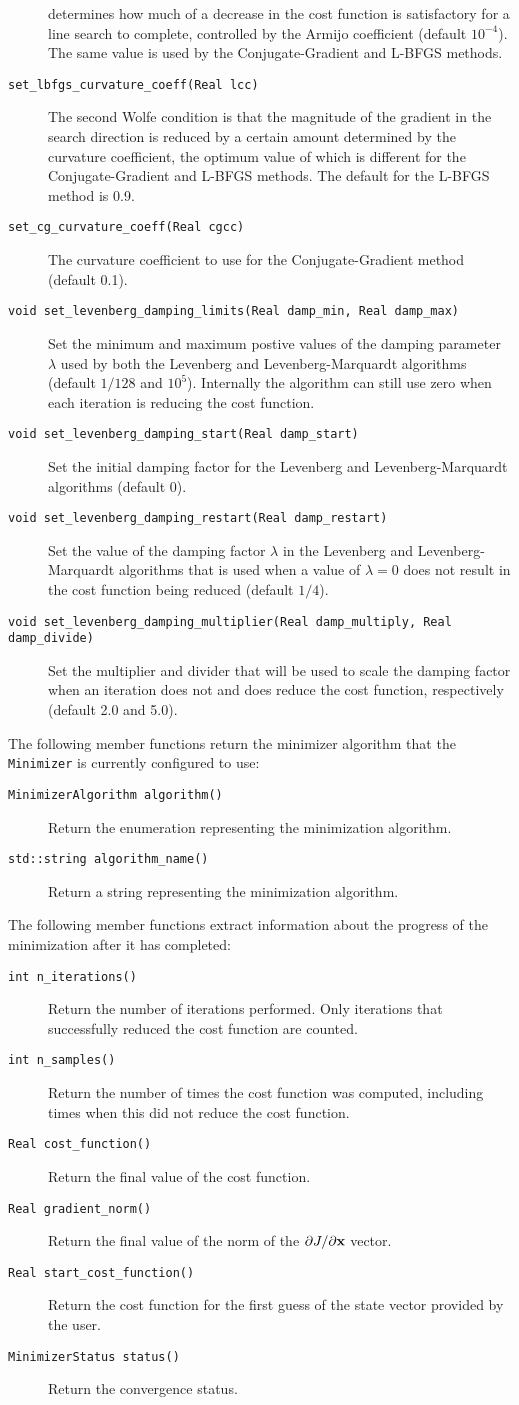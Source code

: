 \documentclass[a4,oneside]{book}
\def\codesize{\small}
\def\code#1{{\codesize\texttt{#1}}}
\def\citem#1{\item[{\codesize\texttt{#1}}]}
\begin{document}
\begin{description}
determines how much of a decrease in the cost function is satisfactory
for a line search to complete, controlled by the Armijo coefficient
(default $10^{-4}$). The same value is used by the Conjugate-Gradient
and L-BFGS methods.
%
\citem{set\_lbfgs\_curvature\_coeff(Real lcc)} The second Wolfe
condition is that the magnitude of the gradient in the search
direction is reduced by a certain amount determined by the curvature
coefficient, the optimum value of which is different for the
Conjugate-Gradient and L-BFGS methods. The default for the L-BFGS
method is 0.9.
%
\citem{set\_cg\_curvature\_coeff(Real cgcc)} The curvature coefficient
to use for the Conjugate-Gradient method (default 0.1).
%
\citem{void set\_levenberg\_damping\_limits(Real damp\_min, Real
  damp\_max)} Set the minimum and maximum postive values of the
damping parameter $\lambda$ used by both the Levenberg and
Levenberg-Marquardt algorithms (default $1/128$ and
$10^5$). Internally the algorithm can still use zero when each
iteration is reducing the cost function.
%
\citem{void set\_levenberg\_damping\_start(Real damp\_start)} Set the
initial damping factor for the Levenberg and Levenberg-Marquardt
algorithms (default 0).
%
\citem{void set\_levenberg\_damping\_restart(Real damp\_restart)} Set
the value of the damping factor $\lambda$ in the Levenberg and
Levenberg-Marquardt algorithms that is used when a value of
$\lambda=0$ does not result in the cost function being reduced
(default $1/4$).
%
\citem{void set\_levenberg\_damping\_multiplier(Real damp\_multiply,
  Real damp\_divide)} Set the multiplier and divider that will be used
to scale the damping factor when an iteration does not and does reduce
the cost function, respectively (default 2.0 and 5.0).
\end{description}
The following member functions return the minimizer algorithm that the
\code{Minimizer} is currently configured to use:
\begin{description}
\citem{MinimizerAlgorithm algorithm()} Return the enumeration
representing the minimization algorithm.
\citem{std::string algorithm\_name()} Return a string representing the
minimization algorithm.
\end{description}
The following member functions extract information about the progress
of the minimization after it has completed:
\begin{description}
\citem{int n\_iterations()} Return the number of iterations performed.
Only iterations that successfully reduced the cost function are
counted.
%
\citem{int n\_samples()} Return the number of times the cost
function was computed, including times when this did not reduce the
cost function.
%
\citem{Real cost\_function()} Return the final value of the cost
function.
%
\citem{Real gradient\_norm()} Return the final value of the norm of
the $\partial J/\partial{\bf x}$ vector.
%
\citem{Real start\_cost\_function()} Return the cost function for the
first guess of the state vector provided by the user.
%
\citem{MinimizerStatus status()} Return the convergence status.
\end{description}
\end{document}
